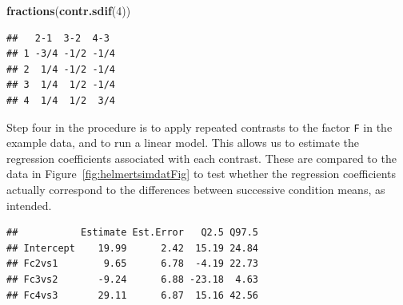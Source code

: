 \documentclass[12pt,]{krantz}
\newenvironment{Shaded}{\begin{snugshade}}{\end{snugshade}}
\newcommand{\DataTypeTok}[1]{\textcolor[rgb]{0.13,0.29,0.53}{#1}}
\newcommand{\DecValTok}[1]{\textcolor[rgb]{0.00,0.00,0.81}{#1}}
\newcommand{\KeywordTok}[1]{\textcolor[rgb]{0.13,0.29,0.53}{\textbf{#1}}}
\newcommand{\NormalTok}[1]{#1}
\newcommand{\OperatorTok}[1]{\textcolor[rgb]{0.81,0.36,0.00}{\textbf{#1}}}
\newcommand{\StringTok}[1]{\textcolor[rgb]{0.31,0.60,0.02}{#1}}
\theoremstyle{definition}
\theoremstyle{definition}
\theoremstyle{definition}
\theoremstyle{remark}
\begin{document}
\begin{Shaded}
\begin{Highlighting}[]
\KeywordTok{fractions}\NormalTok{(}\KeywordTok{contr.sdif}\NormalTok{(}\DecValTok{4}\NormalTok{))}
\end{Highlighting}
\end{Shaded}

\begin{verbatim}
##   2-1  3-2  4-3 
## 1 -3/4 -1/2 -1/4
## 2  1/4 -1/2 -1/4
## 3  1/4  1/2 -1/4
## 4  1/4  1/2  3/4
\end{verbatim}

Step four in the procedure is to apply repeated contrasts to the factor \texttt{F} in the example data, and to run a linear model. This allows us to estimate the regression coefficients associated with each contrast. These are compared to the data in Figure~\ref{fig:helmertsimdatFig} to test whether the regression coefficients actually correspond to the differences between successive condition means, as intended.

\begin{Shaded}
\end{Shaded}

\begin{verbatim}
##           Estimate Est.Error   Q2.5 Q97.5
## Intercept    19.99      2.42  15.19 24.84
## Fc2vs1        9.65      6.78  -4.19 22.73
## Fc3vs2       -9.24      6.88 -23.18  4.63
## Fc4vs3       29.11      6.87  15.16 42.56
\end{verbatim}
\end{document}
